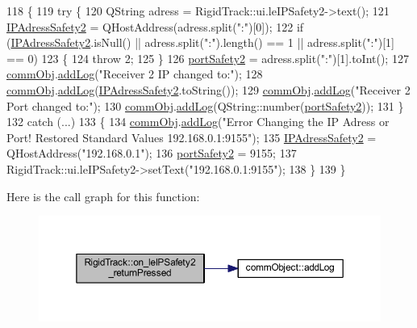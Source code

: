 \begin{DoxyCode}
118 \{
119     \textcolor{keywordflow}{try} \{
120     QString adress = RigidTrack::ui.leIPSafety2->text();
121     \hyperlink{main_8cpp_a354806cf8cbface3575f2541d8fbcbda}{IPAdressSafety2} = QHostAddress(adress.split(\textcolor{stringliteral}{":"})[0]);
122     \textcolor{keywordflow}{if} (\hyperlink{main_8cpp_a354806cf8cbface3575f2541d8fbcbda}{IPAdressSafety2}.isNull() || adress.split(\textcolor{stringliteral}{":"}).length() == 1 || adress.split(\textcolor{stringliteral}{":"})[1] 
      == 0)
123     \{
124         \textcolor{keywordflow}{throw} 2;
125     \}
126     \hyperlink{main_8cpp_a2601be9c226be24c71ec8282f632e723}{portSafety2} = adress.split(\textcolor{stringliteral}{":"})[1].toInt();
127     \hyperlink{main_8cpp_af29e7fc07ae0979d5fb61b473241d33d}{commObj}.\hyperlink{classcomm_object_aec354c7099b3039083cc4224e071e022}{addLog}(\textcolor{stringliteral}{"Receiver 2 IP changed to:"});
128     \hyperlink{main_8cpp_af29e7fc07ae0979d5fb61b473241d33d}{commObj}.\hyperlink{classcomm_object_aec354c7099b3039083cc4224e071e022}{addLog}(\hyperlink{main_8cpp_a354806cf8cbface3575f2541d8fbcbda}{IPAdressSafety2}.toString());
129     \hyperlink{main_8cpp_af29e7fc07ae0979d5fb61b473241d33d}{commObj}.\hyperlink{classcomm_object_aec354c7099b3039083cc4224e071e022}{addLog}(\textcolor{stringliteral}{"Receiver 2 Port changed to:"});
130     \hyperlink{main_8cpp_af29e7fc07ae0979d5fb61b473241d33d}{commObj}.\hyperlink{classcomm_object_aec354c7099b3039083cc4224e071e022}{addLog}(QString::number(\hyperlink{main_8cpp_a2601be9c226be24c71ec8282f632e723}{portSafety2}));
131     \}
132     \textcolor{keywordflow}{catch} (...)
133     \{
134         \hyperlink{main_8cpp_af29e7fc07ae0979d5fb61b473241d33d}{commObj}.\hyperlink{classcomm_object_aec354c7099b3039083cc4224e071e022}{addLog}(\textcolor{stringliteral}{"Error Changing the IP Adress or Port! Restored Standard Values
       192.168.0.1:9155"});
135         \hyperlink{main_8cpp_a354806cf8cbface3575f2541d8fbcbda}{IPAdressSafety2} = QHostAddress(\textcolor{stringliteral}{"192.168.0.1"});
136         \hyperlink{main_8cpp_a2601be9c226be24c71ec8282f632e723}{portSafety2} = 9155;
137         RigidTrack::ui.leIPSafety2->setText(\textcolor{stringliteral}{"192.168.0.1:9155"});
138     \}
139 \}
\end{DoxyCode}
Here is the call graph for this function\+:
\nopagebreak
\begin{figure}[H]
\begin{center}
\leavevmode
\includegraphics[width=350pt]{class_rigid_track_a555c536593d659b940de43cd2db8d6c1_cgraph}
\end{center}
\end{figure}
